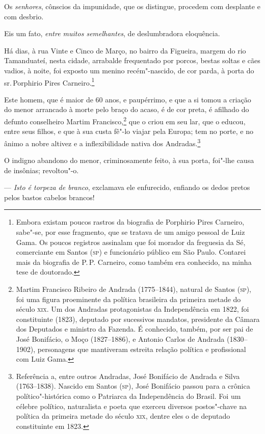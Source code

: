 Os \emph{senhores}, cônscios da impunidade, que os distingue, procedem
com desplante e com desbrio.

Eis um fato, \emph{entre muitos semelhantes}, de deslumbradora
eloquência.

Há dias, à rua Vinte e Cinco de Março, no bairro da Figueira, margem do
rio Tamanduateí, nesta cidade, arrabalde frequentado por porcos, bestas
soltas e cães vadios, à noite, foi exposto um menino recém"-nascido, de
cor parda, à porta do sr.\,Porphirio Pires Carneiro.\footnote{Embora
  existam poucos rastros da biografia de Porphirio Pires Carneiro,
  sabe"-se, por esse fragmento, que se tratava de um amigo pessoal de
  Luiz Gama. Os poucos registros assinalam que foi morador da
  freguesia da Sé, comerciante em Santos (\textsc{sp}) e funcionário público em
  São Paulo. Contarei mais da biografia de P.\,P. Carneiro, como também
  era conhecido, na minha tese de doutorado.}

Este homem, que é maior de 60 anos, e paupérrimo, e que a si tomou a
criação do menor arrancado à morte pelo braço do acaso, é de cor preta,
é afilhado do defunto conselheiro Martim Francisco,\footnote{Martim
  Francisco Ribeiro de Andrada (1775--1844), natural de Santos (\textsc{sp}), foi
  uma figura proeminente da política brasileira da primeira metade do
  século \textsc{xix}. Um dos Andradas protagonistas da Independência em 1822,
  foi constituinte (1823), deputado por sucessivos mandatos, presidente
  da Câmara dos Deputados e ministro da Fazenda. É conhecido, também,
  por ser pai de José Bonifácio, o Moço (1827--1886), e Antonio Carlos de
  Andrada (1830--1902), personagens que mantiveram estreita relação
  política e profissional com Luiz Gama.} que o criou em seu lar, que o
educou, entre seus filhos, e que à sua custa fê"-lo viajar pela Europa;
tem no porte, e no ânimo a nobre altivez e a inflexibilidade nativa dos
Andradas.\footnote{Referência a, entre outros Andradas, José Bonifácio
  de Andrada e Silva (1763--1838). Nascido em Santos (\textsc{sp}), José Bonifácio
  passou para a crônica político"-histórica como o Patriarca da
  Independência do Brasil. Foi um célebre político, naturalista e poeta
  que exerceu diversos postos"-chave na política da primeira metade do
  século \textsc{xix}, dentre eles o de deputado constituinte em 1823.}

O indigno abandono do menor, criminosamente feito, à sua porta, foi"-lhe
causa de insônias; revoltou"-o.

--- \emph{Isto é torpeza de branco}, exclamava ele enfurecido, enfiando
os dedos pretos pelos bastos cabelos brancos!

